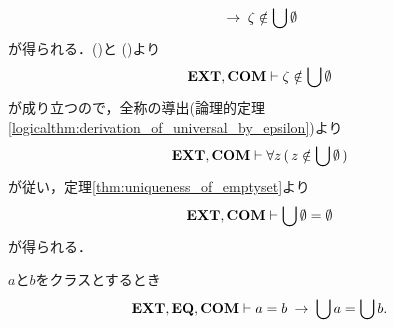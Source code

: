 \begin{sketch}
\begin{align}
			\hspace{0.25em}\rightarrow\hspace{0.25em} \zeta \notin \bigcup \emptyset
			\label{fom:the_union_of_the_emptyset_is_empty_2}
		\end{align}
		が得られる．()と
		()より
		\begin{align}
			\mbox{{\bf EXT}},\mbox{\bf COM} \vdash \zeta \notin \bigcup \emptyset
		\end{align}
		が成り立つので，全称の導出(論理的定理\ref{logicalthm:derivation_of_universal_by_epsilon})より
		\begin{align}
			\mbox{{\bf EXT}},\mbox{\bf COM} \vdash \forall z\, (\, z \notin \bigcup \emptyset\, )
		\end{align}
		が従い，定理\ref{thm:uniqueness_of_emptyset}より
		\begin{align}
			\mbox{{\bf EXT}},\mbox{\bf COM} \vdash \bigcup \emptyset = \emptyset
		\end{align}
		が得られる．
		\QED
	\end{sketch}
	
	\begin{screen}
		\begin{thm}[等しいクラスの合併は等しい]\label{thm:unions_of_equal_classes_are_equal}
			$a$と$b$をクラスとするとき
			\begin{align}
				\mbox{{\bf EXT}},\mbox{{\bf EQ}},\mbox{\bf COM} \vdash a = b \hspace{0.25em}\rightarrow\hspace{0.25em} \bigcup a = \bigcup b.
			\end{align}
		\end{thm}
	\end{screen}
	

